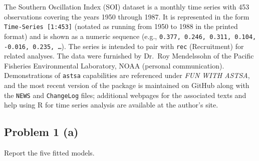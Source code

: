 \documentclass[
  10pt,
]{extarticle}
\begin{document}
The Southern Oscillation Index (SOI) dataset is a monthly time series with 453 observations covering the years 1950 through 1987. It is represented in the form \texttt{Time-Series [1:453]} (notated as running from 1950 to 1988 in the printed format) and is shown as a numeric sequence (e.g., \texttt{0.377, 0.246, 0.311, 0.104, -0.016, 0.235, \dots}). The series is intended to pair with \texttt{rec} (Recruitment) for related analyses. The data were furnished by Dr.~Roy Mendelssohn of the Pacific Fisheries Environmental Laboratory, NOAA (personal communication). Demonstrations of \texttt{astsa} capabilities are referenced under \emph{FUN WITH ASTSA}, and the most recent version of the package is maintained on GitHub along with the \texttt{NEWS} and \texttt{ChangeLog} files; additional webpages for the associated texts and help using \textsf{R} for time series analysis are available at the author's site.

\newpage

\subsection{Problem 1 (a)}\label{problem-1-a}

\begin{problem}[Problem 1 (a)]
Report the five fitted models.
\end{problem}
\end{document}
